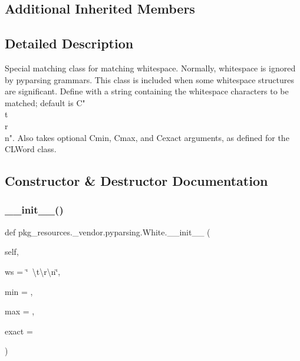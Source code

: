 \subsection*{Additional Inherited Members}


\subsection{Detailed Description}
\begin{DoxyVerb}Special matching class for matching whitespace.  Normally, whitespace is ignored
by pyparsing grammars.  This class is included when some whitespace structures
are significant.  Define with a string containing the whitespace characters to be
matched; default is C{" \\t\\r\\n"}.  Also takes optional C{min}, C{max}, and C{exact} arguments,
as defined for the C{L{Word}} class.
\end{DoxyVerb}
 

\subsection{Constructor \& Destructor Documentation}
\mbox{\label{classpkg__resources_1_1__vendor_1_1pyparsing_1_1White_a792c04c5fbca98c7c1ec77d9713eb7fa}} 
\subsubsection{\texorpdfstring{\+\_\+\+\_\+init\+\_\+\+\_\+()}{\_\_init\_\_()}}
{\footnotesize\ttfamily def pkg\+\_\+resources.\+\_\+vendor.\+pyparsing.\+White.\+\_\+\+\_\+init\+\_\+\+\_\+ (\begin{DoxyParamCaption}\item[{}]{self,  }\item[{}]{ws = {\ttfamily \char`\"{}~\textbackslash{}t\textbackslash{}r\textbackslash{}n\char`\"{}},  }\item[{}]{min = {},  }\item[{}]{max = {},  }\item[{}]{exact = {} }\end{DoxyParamCaption})}



